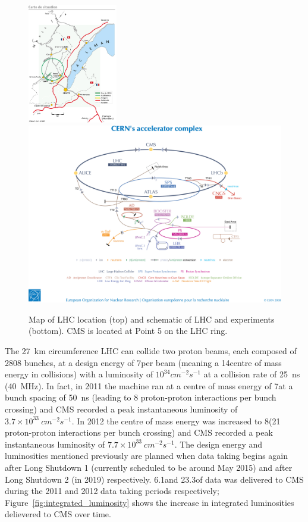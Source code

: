 \begin{figure}[hbtp]
   \centering
     \includegraphics[width=0.35\textwidth]{Chapters/03_Detector/Images/lhc-pho-1997-169.jpg}\\
     \includegraphics[width=\textwidth]{Chapters/03_Detector/Images/0812015.jpg}%
     \caption{Map of LHC location (top) and schematic of LHC and experiments (bottom). CMS is located at Point
     5 on the LHC ring.}
     \label{fig:LHC_and_CMS_map}
\end{figure}

The 27~km circumference LHC can collide two proton beams, each composed of 2808 bunches, at a design energy of
7\TeV per beam (meaning a 14\TeV centre of mass energy in collisions) with a luminosity of $10^{34}
cm^{-2}s^{-1}$ at a collision rate of 25~ns (40~MHz). In fact, in 2011 the machine ran at a centre of mass
energy of 7\TeV at a bunch spacing of 50~ns (leading to 8 proton-proton interactions per bunch crossing) and
CMS recorded a peak instantaneous luminosity of $3.7\times10^{33}~cm^{-2}s^{-1}$. In 2012 the centre of mass
energy was increased to 8\TeV (21 proton-proton interactions per bunch crossing) and CMS recorded a peak
instantaneous luminosity of $7.7\times10^{33}~cm^{-2}s^{-1}$. The design energy and luminosities mentioned
previously are planned when data taking begins again after Long Shutdown 1 (currently scheduled to be around
May 2015) and after Long Shutdown 2 (in 2019) respectively. 6.1\fbinv and 23.3\fbinv of
data was delivered to CMS during the 2011 and 2012 data taking periods respectively;
Figure~\ref{fig:integrated_luminosity} shows the increase in integrated luminosities delievered to CMS over
time.

